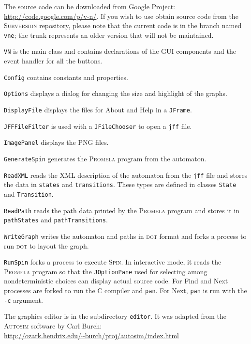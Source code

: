 \documentclass[11pt]{article}
\newcommand{\dt}{\textsc{dot}}
\newcommand{\spn}{\textsc{Spin}}
\newcommand{\prm}{\textsc{Promela}}
\newcommand{\p}[1]{\texttt{#1}}
\newcommand{\bu}[1]{\textsf{#1}}
\begin{document}
The source code can be downloaded from Google Project:
\url{http://code.google.com/p/v-n/}. If you wish to use obtain source
code from the \textsc{Subversion} repository, please note that the
current code is in the branch named \p{vne}; the trunk represents an
older version that will not be maintained.

\p{VN} is the main class and contains declarations
of the GUI components and the event handler for all the buttons.

\p{Config} contains constants and properties.

\p{Options} displays a dialog for changing the size and highlight of the
graphs.

\p{DisplayFile} displays the files for \bu{About} and \bu{Help}
in a \p{JFrame}.

\p{JFFFileFilter} is used with a \p{JFileChooser} to open a \p{jff} file.

\p{ImagePanel} displays the \textsc{PNG} files.

\p{GenerateSpin} generates the \prm{} program from the automaton.

\p{ReadXML} reads the XML description of the automaton from the \p{jff}
file and stores the data in \p{states} and \p{transitions}. These types
are defined in classes \p{State} and \p{Transition}.

\p{ReadPath} reads the path data printed by the \prm{} program and
stores it in \p{pathStates} and \p{pathTransitions}.

\p{WriteGraph} writes the automaton and paths in \dt{} format and forks
a process to run \dt{} to layout the graph.

\p{RunSpin} forks a process to execute \spn{}. In interactive mode, it
reads the \prm{} program so that the \p{JOptionPane} used for selecting
among nondeterministic choices can display actual source code. For
\bu{Find} and \bu{Next} processes are forked to run the C compiler and
\p{pan}. For \bu{Next}, \p{pan} is run with the \p{-c} argument.

The graphics editor is in the subdirectory \p{editor}. It was adapted
from the \textsc{Autosim} software by Carl Burch:
\url{http://ozark.hendrix.edu/~burch/proj/autosim/index.html}
\end{document}
